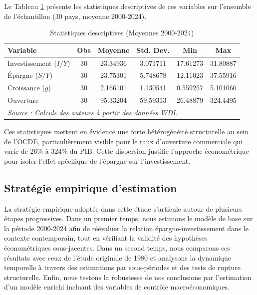 \documentclass[12pt, a4paper]{article}
\begin{document}
Le Tableau \ref{tab:descrip} présente les statistiques descriptives de ces variables sur l'ensemble de l'échantillon (30 pays, moyenne 2000-2024).

\begin{table}[H]
    \centering
    \caption{Statistiques descriptives (Moyennes 2000-2024)}
    \label{tab:descrip}
    \begin{tabular}{lccccc}
        \toprule
        \textbf{Variable} & \textbf{Obs} & \textbf{Moyenne} & \textbf{Std. Dev.} & \textbf{Min} & \textbf{Max} \\
        \midrule
        Investissement ($I/Y$) & 30 & 23.34936 & 3.071711 & 17.61273 & 31.80887 \\
        Épargne ($S/Y$) & 30 & 23.75301 & 5.748678 & 12.11023 & 37.55916 \\
        Croissance ($g$) & 30 & 2.166101 & 1.130541 & 0.559257 & 5.101066 \\
        Ouverture & 30 & 95.33204 & 59.59313 & 26.48879 & 324.4495 \\
        \bottomrule
        \multicolumn{6}{l}{\footnotesize \textit{Source : Calculs des auteurs à partir des données WDI.}} \\
    \end{tabular}
\end{table}

Ces statistiques mettent en évidence une forte hétérogénéité structurelle au sein de l'OCDE, particulièrement visible pour le taux d'ouverture commerciale qui varie de 26\% à 324\% du PIB. Cette dispersion justifie l'approche économétrique pour isoler l'effet spécifique de l'épargne sur l'investissement.

\subsection{Stratégie empirique d’estimation}

La stratégie empirique adoptée dans cette étude s’articule autour de plusieurs étapes progressives. Dans un premier temps, nous estimons le modèle de base sur la période 2000-2024 afin de réévaluer la relation épargne-investissement dans le contexte contemporain, tout en vérifiant la validité des hypothèses économétriques sous-jacentes. Dans un second temps, nous comparons ces résultats avec ceux de l'étude originale de 1980 et analysons la dynamique temporelle à travers des estimations par sous-périodes et des tests de rupture structurelle. Enfin, nous testons la robustesse de nos conclusions par l'estimation d'un modèle enrichi incluant des variables de contrôle macroéconomiques.
\end{document}
